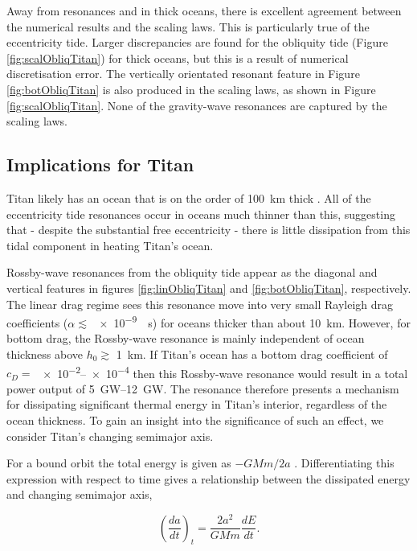 Away from resonances and in thick oceans, there is excellent agreement between the numerical results and the scaling laws. This is particularly true of the eccentricity tide. Larger discrepancies are found for the obliquity tide (Figure \ref{fig:scalObliqTitan}) for thick oceans, but this is a result of numerical discretisation error. The vertically orientated resonant feature in Figure \ref{fig:botObliqTitan} is also produced in the scaling laws, as shown in Figure \ref{fig:scalObliqTitan}. None of the gravity-wave resonances are captured by the scaling laws. 

\subsection{Implications for Titan}

Titan likely has an ocean that is on the order of \SI{100}{\kilo\metre} thick \citep{sohl2014structural,baland2014titan}. All of the eccentricity tide resonances occur in oceans much thinner than this, suggesting that - despite the substantial free eccentricity - there is little dissipation from this tidal component in heating Titan's ocean.

Rossby-wave resonances from the obliquity tide appear as the diagonal and vertical features in figures \ref{fig:linObliqTitan} and \ref{fig:botObliqTitan}, respectively. The linear drag regime sees this resonance move into very small Rayleigh drag coefficients ($\alpha \lesssim$ \SI{e-9}{\per\second}) for oceans thicker than about \SI{10}{\kilo\metre}. However, for bottom drag, the Rossby-wave resonance is mainly independent of ocean thickness above $h_0 \gtrsim$ \SI{1}{\kilo\metre}. If Titan's ocean has a bottom drag coefficient of $c_D =$ \numrange{e-2}{e-4} then this Rossby-wave resonance would result in a total power output of \SIrange{5}{12}{\giga\watt}. The resonance therefore presents a mechanism for dissipating significant thermal energy in Titan's interior, regardless of the ocean thickness. To gain an insight into the significance of such an effect, we consider Titan's changing semimajor axis.

For a bound orbit the total energy is given as $-GMm/2a$ \citep{murray1999solar}. Differentiating this expression with respect to time gives a relationship between the dissipated energy and changing semimajor axis,

\begin{equation}
\left( \dfrac{da}{dt} \right)_t = \dfrac{2a^2}{GM m}\dfrac{dE}{dt}.
\label{eq:adot_t}
\end{equation}

